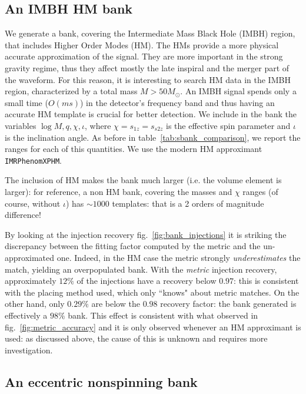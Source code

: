 \documentclass[twocolumn,showpacs,preprintnumbers,nofootinbib,prd,
superscriptaddress,10pt]{revtex4-2}
\begin{document}
\subsection{An IMBH HM bank}\label{sec:HM_bank}

We generate a bank, covering the Intermediate Mass Black Hole (IMBH) region, that includes Higher Order Modes (HM). The HMs provide a more physical accurate approximation of the signal. They are more important in the strong gravity regime, thus they affect mostly the late inspiral and the merger part of the waveform.
For this reason, it is interesting to search HM data in the IMBH region, characterized by a total mass $M>50 M_\odot$. An IMBH signal spends only a small time ($O(ms)$) in the detector's frequency band and thus having an accurate HM template is crucial for better detection.
We include in the bank the variables $\log M, q, \chi, \iota$, where $\chi=s_{1z}=s_{s2z}$ is the effective spin parameter and $\iota$ is the inclination angle.
As before in table~\ref{tab:sbank_comparison}, we report the ranges for each of this quantities. We use the modern HM approximant \texttt{IMRPhenomXPHM}.

The inclusion of HM makes the bank much larger (i.e. the volume element is larger): for reference, a non HM bank, covering the masses and $\chi$ ranges (of course, without $\iota$) has $\sim 1000$ templates: that is a 2 orders of magnitude difference!

By looking at the injection recovery fig.~\ref{fig:bank_injections} it is striking the discrepancy between the fitting factor computed by the metric and the un-approximated one. Indeed, in the HM case the metric strongly {\it underestimates} the match, yielding an overpopulated bank. With the {\it metric} injection recovery, approximately $12\%$ of the injections have a recovery below $0.97$: this is consistent with the placing method used, which only ``knows" about metric matches. On the other hand, only $0.29\%$ are below the $0.98$ recovery factor: the bank generated is effectively a $98\%$ bank.
This effect is consistent with what observed in fig.~\ref{fig:metric_accuracy} and it is only observed whenever an HM approximant is used: as discussed above, the cause of this is unknown and requires more investigation.

\subsection{An eccentric nonspinning bank}\label{sec:eccentric_bank}
\end{document}
